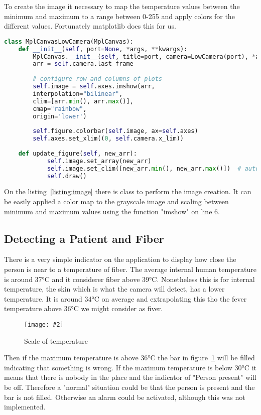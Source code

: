 \documentclass[hidelinks,11pt,a4paper,oneside,article]{memoir}
\newcommand{\putimage}[3][10] %
{
\begin{figure}[h]
    \centering
    \captionsetup{justification=centering}
    \texttt{[image: \#2]}
    \caption{#3}
    \label{fig:#2}
\end{figure}
}
\begin{document}
To create the image it necessary to map the temperature values between the minimum and maximum to a range between 0-255 and apply colors for the different values. Fortunately matplotlib does this for us.

\begin{lstlisting}[label={listing:image},caption={Class to get serial data from the cameras},language=Python, style=styleprogramming]
class MplCanvasLowCamera(MplCanvas):
    def __init__(self, port=None, *args, **kwargs):
        MplCanvas.__init__(self, title=port, camera=LowCamera(port), *args, **kwargs)
        arr = self.camera.last_frame
        
        # configure row and columns of plots
        self.image = self.axes.imshow(arr,
        interpolation="bilinear",
        clim=[arr.min(), arr.max()],
        cmap="rainbow",
        origin='lower')
        
        self.figure.colorbar(self.image, ax=self.axes)
        self.axes.set_xlim((0, self.camera.x_lim))
    
    def update_figure(self, new_arr):
            self.image.set_array(new_arr)
            self.image.set_clim([new_arr.min(), new_arr.max()])  # autoscale
            self.draw()

\end{lstlisting}

On the listing~\ref{listing:image} there is class to perform the image creation. It can be easily applied a color map to the grayscale image and scaling between minimum and maximum values using the function "imshow" on line 6.


\subsection*{Detecting a Patient and Fiber}
There is a very simple indicator on the application to display how close the person is near to a temperature of fiber. The average internal human temperature is around 37°C and it considerer fiber above 39°C. Nonetheless this is for internal temperature, the skin which is what the camera will detect, has a lower temperature. It is around 34°C on average and extrapolating this tho the fever temperature above 36°C we might consider as fiver.
    \putimage{fever}{Scale of temperature}
Then if the maximum temperature is above 36°C the bar in figure~\ref{fig:fever} will be filled indicating that something is wrong. If the maximum temperature is below 30°C it means that there is nobody in the place and the indicator of "Person present" will be off. Therefore a "normal" situation could be that the person is present and the bar is not filled. Otherwise an alarm could be activated, although this was not implemented.
\end{document}
